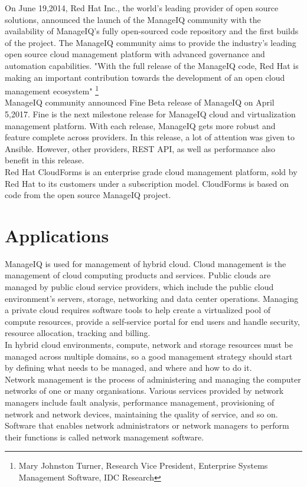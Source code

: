 \documentclass[a4paper,12pt]{report}
\begin{document}
On June 19,2014, Red Hat Inc., the world’s leading provider of open source solutions, announced the launch of the ManageIQ community with the availability of ManageIQ’s fully open-sourced code repository and the first builds of the project. The ManageIQ community aims to provide the industry's leading open source cloud management platform with advanced governance and automation capabilities.
"With the full release of the ManageIQ code, Red Hat is making an important contribution towards the development of an open cloud management ecosystem"
\footnote{Mary Johnston Turner, Research Vice President, Enterprise Systems Management Software, IDC Research}\\

ManageIQ community announced Fine Beta release of ManageIQ on April 5,2017. Fine is the next milestone release for ManageIQ cloud and virtualization management platform. With each release, ManageIQ gets more robust and feature complete across providers. In this release, a lot of attention was given to Ansible. However, other providers, REST API, as well as performance also benefit in this release.\\

Red Hat CloudForms is an enterprise grade cloud management platform, sold by Red Hat to its customers under a subscription model. CloudForms is based on code from the open source ManageIQ project.

\chapter{Applications}
ManageIQ is used for management of hybrid cloud. Cloud management is the management of cloud computing products and services. Public clouds are managed by public cloud service providers, which include the public cloud environment’s servers, storage, networking and data center operations. Managing a private cloud requires software tools to help create a virtualized pool of compute resources, provide a self-service portal for end users and handle security, resource allocation, tracking and billing.\\

In hybrid cloud environments, compute, network and storage resources must be managed across multiple domains, so a good management strategy should start by defining what needs to be managed, and where and how to do it.\\

Network management is the process of administering and managing the computer networks of one or many organisations. Various services provided by network managers include fault analysis, performance management, provisioning of network and network devices, maintaining the quality of service, and so on. Software that enables network administrators or network managers to perform their functions is called network management software.\\
\end{document}
